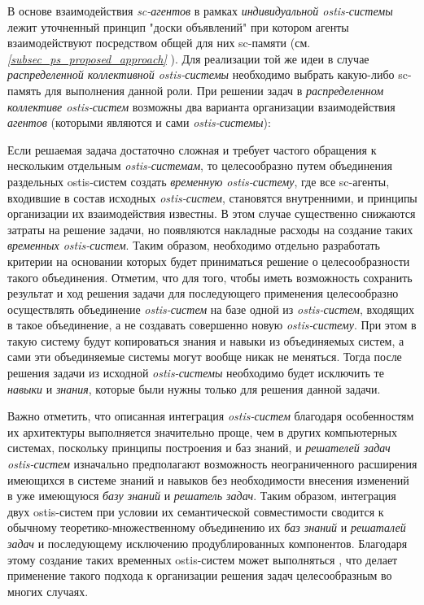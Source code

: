 В основе взаимодействия \textit{sc-агентов} в рамках \textit{индивидуальной ostis-системы} лежит уточненный принцип "доски объявлений"{} при котором агенты взаимодействуют посредством общей для них sc-памяти (см. \textit{\ref{subsec_ps_proposed_approach} }). Для реализации той же идеи в случае \textit{распределенной коллективной ostis-системы} необходимо выбрать какую-либо sc-память для выполнения данной роли. При решении задач в \textit{распределенном коллективе ostis-систем} возможны два варианта организации взаимодействия \textit{агентов} (которыми являются и сами \textit{ostis-системы}):
\begin{textitemize}
	\item Если решаемая задача достаточно сложная и требует частого обращения к нескольким отдельным \textit{ostis-системам}, то целесообразно путем объединения раздельных ostis-систем создать \textit{временную ostis-систему}, где все sc-агенты, входившие в состав исходных \textit{ostis-систем}, становятся внутренними, и принципы организации их взаимодействия известны. В этом случае существенно снижаются затраты на решение задачи, но появляются накладные расходы на создание таких \textit{временных ostis-систем}. Таким образом, необходимо отдельно разработать критерии на основании которых будет приниматься решение о целесообразности такого объединения. Отметим, что для того, чтобы иметь возможность сохранить результат и ход решения задачи для последующего применения целесообразно осуществлять объединение \textit{ostis-систем} на базе одной из \textit{ostis-систем}, входящих в такое объединение, а не создавать совершенно новую \textit{ostis-систему}. При этом в такую систему будут копироваться знания и навыки из объединяемых систем, а сами эти объединяемые системы могут вообще никак не меняться. Тогда после решения задачи из исходной \textit{ostis-системы} необходимо будет исключить те \textit{навыки} и \textit{знания}, которые были нужны только для решения данной задачи.
	
	Важно отметить, что описанная интеграция \textit{ostis-систем} благодаря особенностям их архитектуры выполняется значительно проще, чем в других компьютерных системах, поскольку принципы построения и баз знаний, и \textit{решателей задач} \textit{ostis-систем} изначально предполагают возможность неограниченного расширения имеющихся в системе знаний и навыков без необходимости внесения изменений в уже имеющуюся \textit{базу знаний} и \textit{решатель задач}. Таким образом, интеграция двух ostis-систем при условии их семантической совместимости сводится к обычному теоретико-множественному объединению их \textit{баз знаний} и \textit{решаталей задач} и последующему исключению продублированных компонентов. Благодаря этому создание таких временных ostis-систем может выполняться , что делает применение такого подхода к организации решения задач целесообразным во многих случаях.


\end{textitemize}
